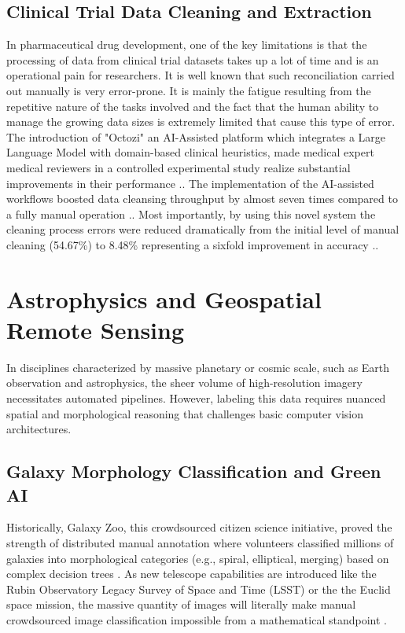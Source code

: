 \documentclass[10pt, conference, letterpaper]{IEEEtran}
\begin{document}
\subsection{Clinical Trial Data Cleaning and Extraction}
In pharmaceutical drug development, one of the key limitations is that the processing of data from clinical trial datasets takes up a lot of time and is an operational pain for researchers. It is well known that such reconciliation carried out manually is very error-prone. It is mainly the fatigue resulting from the repetitive nature of the tasks involved and the fact that the human ability to manage the growing data sizes is extremely limited that cause this type of error.
The introduction of "Octozi" an AI-Assisted platform which integrates a Large Language Model with domain-based clinical heuristics, made medical expert medical reviewers in a controlled experimental study realize substantial improvements in their performance \cite{ref32}.. The implementation of the AI-assisted workflows boosted data cleansing throughput by almost seven times compared to a fully manual operation \cite{ref32}.. Most importantly, by using this novel system the cleaning process errors were reduced dramatically from the initial level of manual cleaning (54.67\%) to 8.48\% representing a sixfold improvement in accuracy \cite{ref32}..

\section{Astrophysics and Geospatial Remote Sensing}
\label{sec:astro}
In disciplines characterized by massive planetary or cosmic scale, such as Earth observation and astrophysics, the sheer volume of high-resolution imagery necessitates automated pipelines. However, labeling this data requires nuanced spatial and morphological reasoning that challenges basic computer vision architectures.

\subsection{Galaxy Morphology Classification and Green AI}
Historically, Galaxy Zoo, this crowdsourced citizen science initiative, proved the strength of distributed manual annotation where volunteers classified millions of galaxies into morphological categories (e.g., spiral, elliptical, merging) based on complex decision trees \cite{ref37}. As new telescope capabilities are introduced like the Rubin Observatory Legacy Survey of Space and Time (LSST) or the the Euclid space mission, the massive quantity of images will literally make manual crowdsourced image classification impossible from a mathematical standpoint \cite{ref37}.
\end{document}
